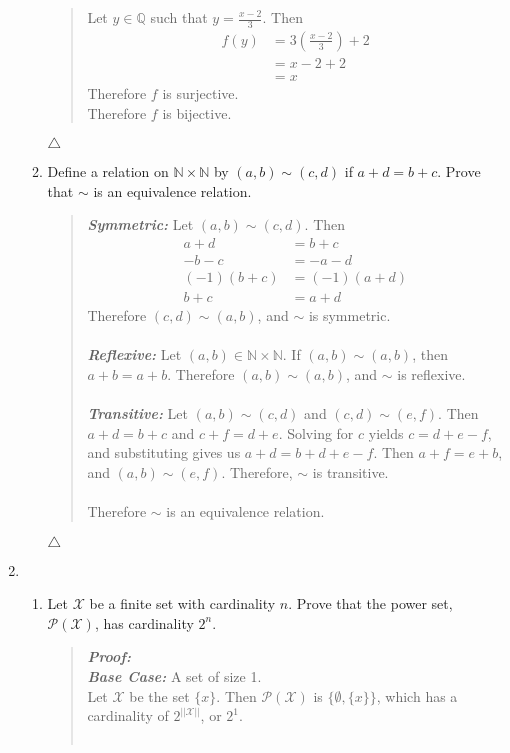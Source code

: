\documentclass{article}
\newcommand{\Proof}{\textit{\textbf{Proof: }}}
\newcommand{\NN}{\mathbb{N}}
\newcommand{\QQ}{\mathbb{Q}}
\begin{document}
\begin{enumerate}
\begin{enumerate}
\begin{quote}
Let $y\in \QQ$ such that $y = \frac{x-2}{3}$. Then
\begin{align*}
f(y) &= 3\left(\frac{x-2}{3}\right) + 2\\
&= x - 2 + 2\\
&= x
\end{align*}
Therefore $f$ is surjective.\\
Therefore $f$ is bijective.
\end{quote}
$\triangle$
\item Define a relation on $\NN \times \NN$ by $(a,b) \sim (c,d)$ if $a + d = b + c$. 
Prove that $\sim$ is an equivalence relation.
\begin{quote}
\textbf{\textit{Symmetric:}} Let $(a,b) \sim (c,d)$. Then
\begin{align*}
a + d &= b + c\\
-b - c &= -a - d\\
(-1)(b + c) &= (-1)(a + d)\\
b + c &= a + d
\end{align*}
Therefore $(c,d) \sim (a,b)$, and $\sim$ is symmetric.\\\\
\textbf{\textit{Reflexive:}} Let $(a,b) \in\NN\times\NN$. 
If $(a,b) \sim (a,b)$, then $a + b = a + b$.
Therefore $(a,b) \sim (a,b)$, and $\sim$ is reflexive.\\\\
\textbf{\textit{Transitive:}} Let $(a,b) \sim (c,d)$ and $(c,d) \sim (e,f)$.
Then $a + d = b + c$ and $c + f = d + e$. 
Solving for $c$ yields $c = d + e - f$, and substituting gives us $a + d = b + d + e - f$.
Then $a + f = e + b$, and $(a,b) \sim (e,f)$.
Therefore, $\sim$ is transitive.\\\\
Therefore $\sim$ is an equivalence relation.
\end{quote}
$\triangle$
\end{enumerate}
\newpage
\item
\begin{enumerate}
\item Let $\mathcal{X}$ be a finite set with cardinality $n$.
Prove that the power set, $\mathcal{P}(\mathcal{X})$, has cardinality $2^{n}$.
\begin{quote}
\Proof\\
\textit{\textbf{Base Case:}} A set of size 1.\\
Let $\mathcal{X}$ be the set $\{x\}$.
Then $\mathcal{P}(\mathcal{X})$ is $\{\emptyset,\{x\}\}$, which has a cardinality of $2^{||\mathcal{X}||}$, or $2 ^{1}$.\\\\

\end{quote}
\end{enumerate}
\end{enumerate}
\end{document}
